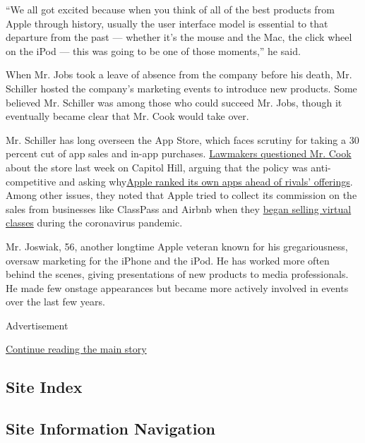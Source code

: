``We all got excited because when you think of all of the best products
from Apple through history, usually the user interface model is
essential to that departure from the past --- whether it's the mouse and
the Mac, the click wheel on the iPod --- this was going to be one of
those moments,'' he said.

When Mr. Jobs took a leave of absence from the company before his death,
Mr. Schiller hosted the company's marketing events to introduce new
products. Some believed Mr. Schiller was among those who could succeed
Mr. Jobs, though it eventually became clear that Mr. Cook would take
over.

Mr. Schiller has long overseen the App Store, which faces scrutiny for
taking a 30 percent cut of app sales and in-app purchases.
\href{https://www.nytimes3xbfgragh.onion/2020/07/29/technology/big-tech-hearing-apple-amazon-facebook-google.html}{Lawmakers
questioned Mr. Cook} about the store last week on Capitol Hill, arguing
that the policy was anti-competitive and asking
why\href{https://www.nytimes3xbfgragh.onion/interactive/2019/09/09/technology/apple-app-store-competition.html}{Apple
ranked its own apps ahead of rivals' offerings}. Among other issues,
they noted that Apple tried to collect its commission on the sales from
businesses like ClassPass and Airbnb when they
\href{https://www.nytimes3xbfgragh.onion/2020/07/28/technology/apple-app-store-airbnb-classpass.html}{began
selling virtual classes} during the coronavirus pandemic.

Mr. Joswiak, 56, another longtime Apple veteran known for his
gregariousness, oversaw marketing for the iPhone and the iPod. He has
worked more often behind the scenes, giving presentations of new
products to media professionals. He made few onstage appearances but
became more actively involved in events over the last few years.

Advertisement

\protect\hyperlink{after-bottom}{Continue reading the main story}

\hypertarget{site-index}{%
\subsection{Site Index}\label{site-index}}

\hypertarget{site-information-navigation}{%
\subsection{Site Information
Navigation}\label{site-information-navigation}}

